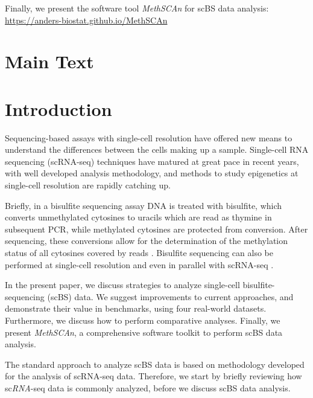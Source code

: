 \documentclass[10pt]{article}
\begin{document}
Finally, we present the software tool \textit{MethSCAn} for scBS data analysis: \url{https://anders-biostat.github.io/MethSCAn}


\section*{Main Text}
\section*{Introduction}

Sequencing-based assays with single-cell resolution have offered new means to understand the differences between the cells making up a sample.
Single-cell RNA sequencing (scRNA-seq) techniques have matured at great pace in recent years, with well developed analysis methodology, and methods to study epigenetics at single-cell resolution are rapidly catching up.


Briefly, in a bisulfite sequencing assay DNA is treated with bisulfite, which converts unmethylated cytosines to uracils which are read as thymine in subsequent PCR, while methylated cytosines are protected from conversion.
After sequencing, these conversions allow for the determination of the methylation status of all cytosines covered by reads \citep{Frommer_1992}.
Bisulfite sequencing can also be performed at single-cell resolution \citep{Smallwood_2014} and even in parallel with scRNA-seq \citep{scMTseq,Clark2018}.

In the present paper, we discuss strategies to analyze single-cell bisulfite-sequencing (scBS) data.
We suggest improvements to current approaches, and demonstrate their value in benchmarks, using four real-world datasets.
Furthermore, we discuss how to perform comparative analyses.
Finally, we present \textit{MethSCAn}, a comprehensive software toolkit to perform scBS data analysis.



The standard approach to analyze scBS data is based on methodology developed for the analysis of scRNA-seq data.
Therefore, we start by briefly reviewing how sc\emph{RNA}-seq data is commonly analyzed, before we discuss scBS data analysis.
\end{document}
